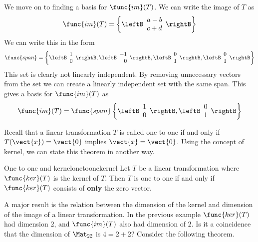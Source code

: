 \begin{solution}
We move on to finding a basis for $\func{im}(T)$. We can write the image of $T$ as 
\[
\func{im}(T) = \left\{ \leftB \begin{array}{c}
a - b \\
c + d
\end{array} \rightB
\right\}
\]
We can write this in the form
\[
\func{span} = \left\{ 
\leftB \begin{array}{r}
1 \\
0
\end{array} \rightB, 
\leftB \begin{array}{r}
-1 \\
0
\end{array} \rightB, 
\leftB \begin{array}{r}
0 \\
1
\end{array} \rightB, 
\leftB \begin{array}{r}
0 \\
1
\end{array} \rightB \right\}
\]
This set is clearly not linearly independent. By removing unnecessary vectors from the set we can create a linearly independent set with the same span. This gives a basis for $\func{im}(T)$ as
\[
\func{im}(T) = \func{span} \left\{
\leftB \begin{array}{r}
1 \\
0
\end{array} \rightB,
\leftB \begin{array}{r}
0 \\
1
\end{array} \rightB
\right\}
\]
\end{solution}

Recall that a linear transformation $T$ is called one to one if and only if $T(\vect{x}) = \vect{0}$ implies $\vect{x} = \vect{0}$. Using the concept of kernel, we can state this theorem in another way.

\begin{theorem}{One to one and kernel}{onetoonekernel}
Let $T$ be a linear transformation where $\func{ker}(T)$ is the kernel of $T$. Then $T$ is one to one if and only if $\func{ker}(T)$ consists of \textbf{only} the zero vector. 
\end{theorem}

A major result is the relation between the dimension of the kernel and
dimension of the image of a linear transformation. In the previous example $\func{ker}(T)$ had dimension $2$, and $\func{im}(T)$ also had dimension of $2$. Is it a coincidence that the dimension of $\Mat_{22}$ is $4 = 2 + 2$? Consider the following theorem. 

